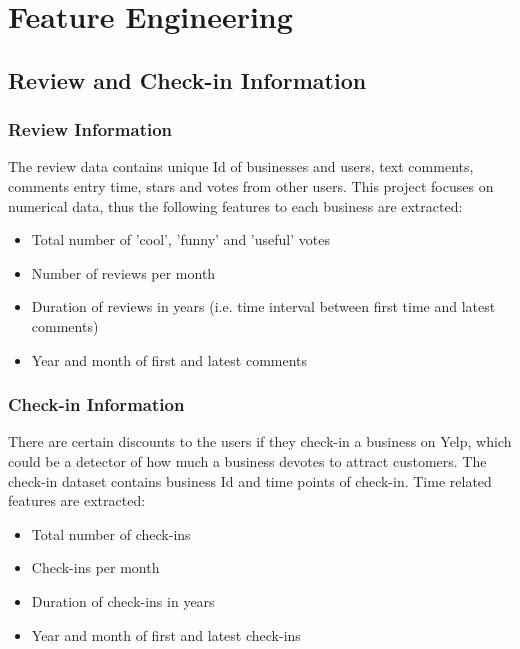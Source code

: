 \documentclass{beamer}
\begin{document}

\section{Feature Engineering}
\subsection{Review and Check-in Information}

\begin{frame}
\frametitle{Review Information}
The review data contains unique Id of businesses and users, text comments, comments entry time, stars and votes from other users. This project focuses on numerical data, thus the following features to each business are extracted:
\vspace{1em}
\begin{itemize}
	\item Total number of 'cool', 'funny' and 'useful' votes 
	\item Number of reviews per month
	\item Duration of reviews in years (i.e. time interval between first time and latest comments)
	\item Year and month of first and latest comments
\end{itemize}

\end{frame}

\begin{frame}
\frametitle{Check-in Information}
There are certain discounts to the users if they check-in a business on Yelp, which could be a detector of how much a business devotes to attract customers. The check-in dataset contains business Id and time points of check-in. Time related features are extracted:
\vspace{1em}
\begin{itemize}
	\item Total number of check-ins
	\item Check-ins per month
	\item Duration of check-ins in years
	\item Year and month of first and latest check-ins
\end{itemize}
\end{frame}
\end{document}
